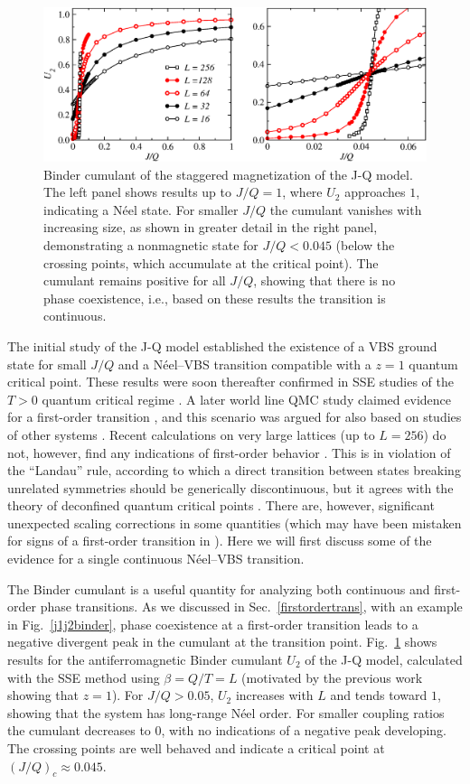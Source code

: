 \documentclass[draft,numberedheadings]{aipproc}
\begin{document}
\begin{figure}
\includegraphics[width=13.5cm, clip]{jqbinder.eps}
\caption{Binder cumulant of the staggered magnetization of the J-Q model. The left panel shows results up to $J/Q=1$,
where $U_2$ approaches $1$, indicating a N\'eel state. For smaller $J/Q$ the cumulant vanishes with increasing size, as
shown in greater detail in the right panel, demonstrating a nonmagnetic state for $J/Q<0.045$ (below the crossing points,
which accumulate at the critical point). The cumulant remains positive for all $J/Q$, showing that there is no phase 
coexistence, i.e., based on these results the transition is continuous.}
\label{jqbinder}
\end{figure}

The initial study of the J-Q model \cite{sandvik1} established the existence of a VBS ground state for small $J/Q$ and a N\'eel--VBS transition
compatible with a $z=1$ quantum critical point. These results were soon thereafter confirmed in SSE studies of the $T>0$ quantum critical regime 
\cite{melko08a,melko08b}. A later world line QMC study claimed evidence for a first-order transition \cite{jiang2}, and this scenario was argued for 
also based on studies of other systems \cite{kuklov08}. Recent calculations on very large lattices (up to $L=256$) do not, however, find any indications 
of first-order behavior \cite{sandviklogs}. This is in violation of the ``Landau'' rule, according to which a direct transition between states breaking
unrelated symmetries should be generically discontinuous, but it agrees with the theory of deconfined quantum critical points \cite{senthil1}.
There are, however, significant unexpected scaling corrections in some quantities (which may have been mistaken for signs of a first-order transition
in \cite{jiang2}). Here we will first discuss some of the evidence for a single continuous N\'eel--VBS transition. 

The Binder cumulant is a useful quantity for analyzing both continuous and first-order phase transitions. As we discussed in Sec.~\ref{firstordertrans}, 
with an example in Fig.~\ref{j1j2binder}, phase coexistence at a first-order transition leads to a negative divergent peak in the cumulant at the
transition point. Fig.~\ref{jqbinder} shows results for the antiferromagnetic Binder cumulant $U_2$ of the J-Q model, calculated with the SSE method 
using $\beta=Q/T=L$ (motivated by the previous work showing that $z=1$). For $J/Q>0.05$, $U_2$ increases with $L$ and tends toward $1$, showing that 
the system has long-range N\'eel order. For smaller coupling ratios the cumulant decreases to $0$, with no indications of a negative peak developing. 
The crossing points are well behaved and indicate a critical point at $(J/Q)_c\approx 0.045$.
\end{document}
